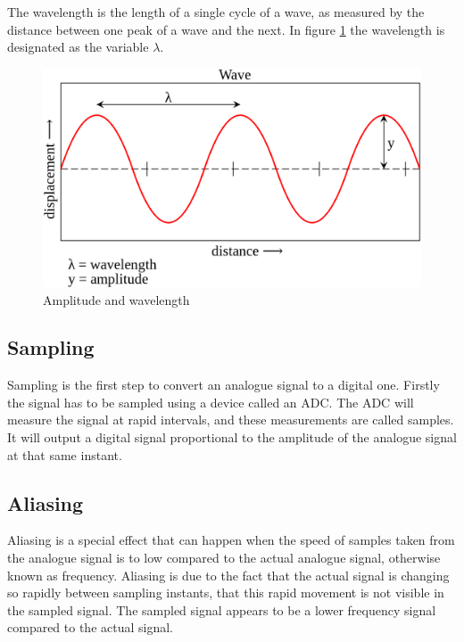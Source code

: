 The wavelength is the length of a single cycle of a wave, as measured by the distance between one peak of a wave and the next. In figure \ref{fig:Amplitude-Wavelenght} the wavelength is designated as the variable $\lambda$.

\begin{figure}[htbp]
	\centering
	\includegraphics[scale=0.25]{baa-documentation/img/Amplitude.png}
	\caption[Amplitude and wavelength illustrated]{Amplitude and wavelength \footnotemark}
	\label{fig:Amplitude-Wavelenght}
\end{figure}

\subsection{Sampling}
\label{sub:Sampling}

Sampling is the first step to convert an analogue signal to a digital one. Firstly the signal has to be sampled using a device called an \gls{ADC}. The \gls{ADC} will measure the signal at rapid intervals, and these measurements are called samples. It will output a digital signal proportional to the amplitude of the analogue signal at that same instant.

\subsection{Aliasing}
\label{sub:Aliasing}

Aliasing is a special effect that can happen when the speed of samples taken from the analogue signal is to low compared to the actual analogue signal, otherwise known as frequency. Aliasing is due to the fact that the actual signal is changing so rapidly between sampling instants, that this rapid movement is not visible in the sampled signal. The sampled signal appears to be a lower frequency signal compared to the actual signal.

